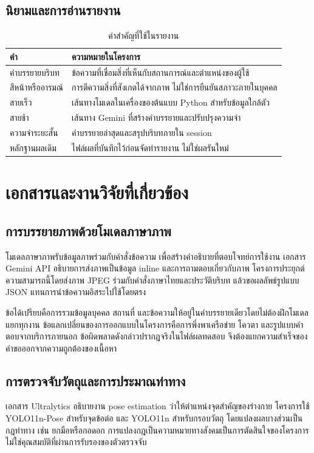 \section{นิยามและการอ่านรายงาน}
\begin{table}[H]\centering\caption{คำสำคัญที่ใช้ในรายงาน}
\begin{tabularx}{\linewidth}{lY}\toprule คำ & ความหมายในโครงการ\\\midrule
คำบรรยายบริบท & ข้อความที่เชื่อมสิ่งที่เห็นกับสถานการณ์และตำแหน่งของผู้ใช้\\
สีหน้าหรืออารมณ์ & การตีความสิ่งที่สังเกตได้จากภาพ ไม่ใช่การยืนยันสภาวะภายในบุคคล\\
สายเร็ว & เส้นทางโมเดลในเครื่องของต้นแบบ Python สำหรับข้อมูลใกล้ตัว\\
สายช้า & เส้นทาง Gemini ที่สร้างคำบรรยายและปรับปรุงความจำ\\
ความจำระยะสั้น & คำบรรยายล่าสุดและสรุปบริบทภายใน session\\
หลักฐานผลเดิม & ไฟล์ผลที่บันทึกไว้ก่อนจัดทำรายงาน ไม่ใช่ผลรันใหม่\\\bottomrule
\end{tabularx}\end{table}

\chapter{เอกสารและงานวิจัยที่เกี่ยวข้อง}
\section{การบรรยายภาพด้วยโมเดลภาษาภาพ}
โมเดลภาษาภาพรับข้อมูลภาพร่วมกับคำสั่งข้อความ เพื่อสร้างคำอธิบายที่ตอบโจทย์การใช้งาน เอกสาร Gemini API อธิบายการส่งภาพเป็นข้อมูล inline และการถามตอบเกี่ยวกับภาพ \cite{gemini} โครงการประยุกต์ความสามารถนี้โดยส่งภาพ JPEG ร่วมกับคำสั่งภาษาไทยและประวัติบริบท แล้วขอผลลัพธ์รูปแบบ JSON แทนการนำข้อความอิสระไปใช้โดยตรง

ข้อได้เปรียบคือการรวมข้อมูลบุคคล สถานที่ และข้อความให้อยู่ในคำบรรยายเดียวโดยไม่ต้องฝึกโมเดลแยกทุกงาน ข้อแลกเปลี่ยนของการออกแบบในโครงการคือการพึ่งพาเครือข่าย โควตา และรูปแบบคำตอบจากบริการภายนอก ข้อผิดพลาดดังกล่าวปรากฏจริงในไฟล์ผลทดสอบ จึงต้องแยกความสำเร็จของคำขอออกจากความถูกต้องของเนื้อหา

\section{การตรวจจับวัตถุและการประมาณท่าทาง}
เอกสาร Ultralytics อธิบายงาน pose estimation ว่าให้ตำแหน่งจุดสำคัญของร่างกาย \cite{yolo} โครงการใช้ YOLO11n-Pose สำหรับจุดข้อต่อ และ YOLO11n สำหรับกรอบวัตถุ โดยแปลงผลบางส่วนเป็นกฎท่าทาง เช่น ยกมือหรือกอดอก การแปลงกฎเป็นความหมายทางสังคมเป็นการตัดสินใจของโครงการ ไม่ใช่คุณสมบัติที่ผ่านการรับรองของตัวตรวจจับ

